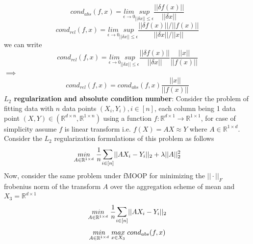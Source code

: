 \begin{equation}
    cond_{abs}(f,x) = \underset{\epsilon \to 0}{lim}\underset{||\delta x||\le \epsilon}{sup} \frac{||\delta f(x)||}{||\delta x||}
\end{equation}
\begin{equation}
    cond_{rel}(f,x) = \underset{\epsilon \to 0}{lim}\underset{||\delta x||\le \epsilon}{sup} \frac{||\delta f(x)||/||f(x)||}{||\delta x||/||x||}
\end{equation}
we can write
\begin{equation}
    cond_{rel}(f,x) = \underset{\epsilon \to 0}{lim}\underset{||\delta x||\le \epsilon}{sup} \frac{||\delta f(x)||}{||\delta x||}\frac{||x||}{||f(x)||}
\end{equation}
$\implies$
\begin{equation} \label{cond_abs_rel_relation}
    cond_{rel}(f,x) = cond_{abs}(f,x)\frac{||x||}{||f(x)||}
\end{equation}
\newline\newline \textbf{$L_2$ regularization and absolute condition number}: Consider the problem of fitting data with $n$ data points $(X_i,Y_i), i \in [n]$, each column being 1 data point $(X,Y) \in (\mathbb{R}^{d\times n},\mathbb{R}^{1\times n})$ using a function $f:\mathbb{R}^{d\times 1}\to \mathbb{R}^{1\times 1}$, for case of simplicity assume $f$ is linear transform i.e. $f(X) = AX \approx Y$ where $A \in \mathbb{R}^{1\times d}$.
\newline Consider the $L_2$ regularization formulations of this problem as follows
\begin{equation} \label{l2_reg_prob_obj}
    \underset{A \in \mathbb{R}^{1\times d}}{min}\hspace{1mm} \frac{1}{n}\mathlarger{\sum}_{i\in [n]} ||AX_i-Y_i||_2 + \lambda ||A||^{2}_{2}
\end{equation}
Now, consider the same problem under fMOOP for minimizing the $||\cdot||_{F}$ frobenius norm of the transform $A$ over the aggregation scheme of mean and $X_3 = \mathbb{R}^{d\times 1}$
\begin{equation} \label{fmoop_l2_rel_obj_1}
    \underset{A \in \mathbb{R}^{1\times d}}{min}\hspace{1mm} \frac{1}{n}\mathlarger{\sum}_{i\in [n]} ||AX_i-Y_i||_2
\end{equation}
\begin{equation} \label{fmoop_l2_rel_obj_2}
    \underset{A \in \mathbb{R}^{1\times d}}{min}\hspace{1mm} \underset{x \in X_3}{max}\hspace{1mm} cond_{abs}(f,x)
\end{equation}
